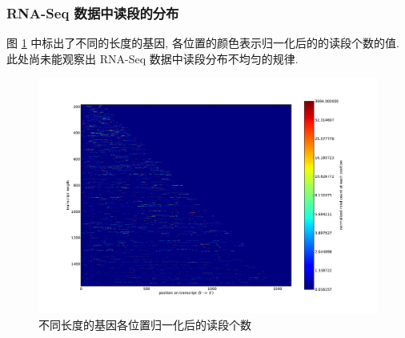\subsubsection{RNA-Seq 数据中读段的分布}
图 \ref{nonunif-read-locations} 中标出了不同的长度的基因, 
各位置的颜色表示归一化后的的读段个数的值. 
此处尚未能观察出 RNA-Seq 数据中读段分布不均匀的规律. 

\begin{figure}[!t]
\centering
\includegraphics[width=\textwidth]{figures/nonunif/isof_len-vs-reads_distr.pdf}
\caption{不同长度的基因各位置归一化后的读段个数}
\label{nonunif-read-locations}
\end{figure}






